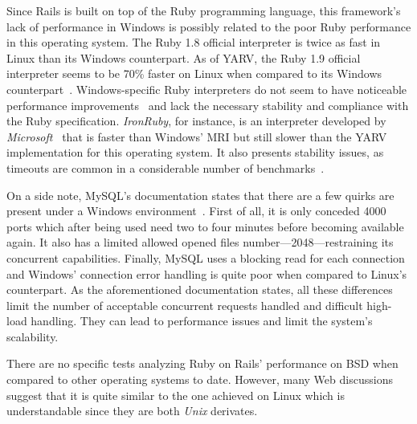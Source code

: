 Since Rails is built on top of the Ruby programming language, this framework's lack of performance in Windows is possibly related to the poor Ruby performance in this operating system. The Ruby 1.8 official interpreter is twice as fast in Linux than its Windows counterpart. As of YARV, the Ruby 1.9 official interpreter seems to be 70\% faster on Linux when compared to its Windows counterpart~\cite{ruby_faster_linux}. Windows-specific Ruby interpreters do not seem to have noticeable performance improvements~\cite{ruby.net} and lack the necessary stability and compliance with the Ruby specification. \textit{IronRuby}, for instance, is an interpreter developed by \textit{Microsoft}~\cite{ror_ecosystem_whitepaper} that is faster than Windows' MRI but still slower than the YARV implementation for this operating system. It also presents stability issues, as timeouts are common in a considerable number of benchmarks~\cite{ironruby_performance}.

On a side note, MySQL's documentation states that there are a few quirks are present under a Windows environment~\cite{mysql_windows_linux}. First of all, it is only conceded 4000 ports which after being used need two to four minutes before becoming available again. It also has a limited allowed opened files number---2048---restraining its concurrent capabilities. Finally, MySQL uses a blocking read for each connection and Windows' connection error handling is quite poor when compared to Linux's counterpart. As the aforementioned documentation states, all these differences limit the number of acceptable concurrent requests handled and difficult high-load handling. They can lead to performance issues and limit the system's scalability.

There are no specific tests analyzing Ruby on Rails' performance on BSD when compared to other operating systems to date. However, many Web discussions suggest that it is quite similar to the one achieved on Linux which is understandable since they are both \textit{Unix} derivates.
